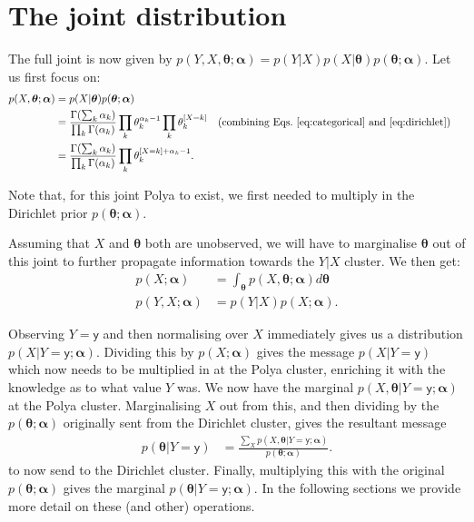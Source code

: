 \documentclass[oneside,english]{scrbook}
\begin{document}
\section{The joint distribution}

The full joint is now given by $p(Y,X,\bm{\theta};\bm{\alpha}) =
p(Y|X)p(X|\bm{\theta})p(\bm{\theta};\bm{\alpha})$. Let us first focus on:
\begin{align}
  p(X,\bm{\theta};\bm{\alpha})
  &= p(X|\bm{\theta})p(\bm{\theta};\bm{\alpha}) \notag\\
  &= \frac{\Gamma(\sum_k \alpha_k)}{\prod_{k}\Gamma(\alpha_k)}
  \prod_{k}\theta_k^{\alpha_k-1} \prod_{k} \theta_k^{\mathbb{[}X=k\mathbb{]}} && \text{(combining Eqs.~\ref{eq:categorical} and
\ref{eq:dirichlet}) }\notag \\
  &= \frac{\Gamma(\sum_k \alpha_k)}{\prod_{k}\Gamma(\alpha_k)}
  \prod_{k}\theta_k^{\mathbb{[}X=k\mathbb{]}+\alpha_k-1}. \label{eq:polya}
\end{align}

Note that, for this joint Polya to exist, we first needed to multiply
in the Dirichlet prior $p(\bm{\theta};\bm{\alpha})$.

Assuming that $X$ and $\bm{\theta}$ both are unobserved, we will have
to marginalise $\bm{\theta}$ out of this joint to further propagate
information towards the $Y|X$ cluster. We then get:
\begin{align*}
p(X;\bm{\alpha}) &= \int_{\bm{\theta}} p(X,\bm{\theta};\bm{\alpha})d\bm{\theta} \\
p(Y,X;\bm{\alpha}) &= p(Y|X)p(X;\bm{\alpha}).
\end{align*}

Observing $Y = \mathsf{y}$ and then normalising over $X$ immediately
gives us a distribution $p(X|Y=\mathsf{y};\bm{\alpha})$.  Dividing
this by $p(X;\bm{\alpha})$ gives the message $p(X|Y=\mathsf{y})$ which
now needs to be multiplied in at the Polya cluster, enriching it with
the knowledge as to what value $Y$ was. We now have the marginal
$p(X,\bm{\theta}|Y = \mathsf{y};\bm{\alpha})$ at the Polya
cluster. Marginalising $X$ out from this, and then dividing by the
$p(\bm{\theta};\bm{\alpha})$ originally sent from the Dirichlet
cluster, gives the resultant message
\begin{align*}
  p(\bm{\theta}|Y =
\mathsf{y}) &= \frac{\sum_Xp(X,\bm{\theta}|Y =
\mathsf{y};\bm{\alpha})}{p(\bm{\theta};\bm{\alpha})}.
\end{align*}
to now send to the Dirichlet cluster. Finally, multiplying this with
the original $p(\bm{\theta};\bm{\alpha})$ gives the marginal
$p(\bm{\theta}|Y = \mathsf{y};\bm{\alpha})$. In the following sections
we provide more detail on these (and other) operations.
\end{document}
